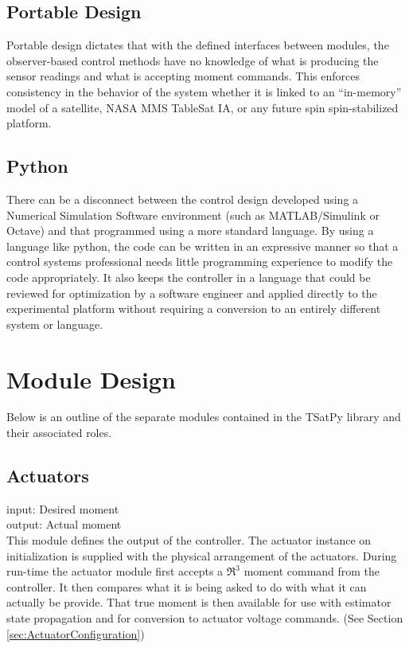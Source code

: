 \subsection{Portable Design}

Portable design dictates that with the defined interfaces between modules, the observer-based control methods have no knowledge of what is producing the sensor readings and what is accepting moment commands. This enforces consistency in the behavior of the system whether it is linked to an ``in-memory'' model of a satellite, NASA MMS TableSat IA, or any future spin spin-stabilized platform.

\subsection{Python}

There can be a disconnect between the control design developed using a Numerical Simulation Software environment (such as MATLAB/Simulink or Octave) and that programmed using a more standard language. By using a language like python, the code can be written in an expressive manner so that a control systems professional needs little programming experience to modify the code appropriately. It also keeps the controller in a language that could be reviewed for optimization by a software engineer and applied directly to the experimental platform without requiring a conversion to an entirely different system or language.


\section{Module Design}
\label{sec:Module Design}

Below is an outline of the separate modules contained in the TSatPy library and their associated roles.

\subsection{Actuators}
\label{subsec:actuators}

input: Desired moment\\
output: Actual moment\\

This module defines the output of the controller. The actuator instance on initialization is supplied with the physical arrangement of the actuators. During run-time the actuator module first accepts a $\Re^3$ moment command from the controller.  It then compares what it is being asked to do with what it can actually be provide.  That true moment is then available for use with estimator state propagation and for conversion to actuator voltage commands. (See Section \ref{sec:ActuatorConfiguration})

